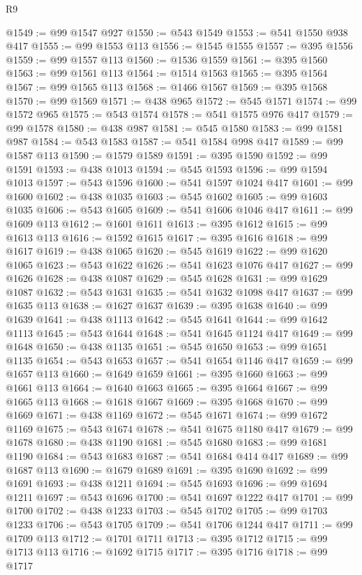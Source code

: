 \begin{lexlean}{R9}
\begin{coremodule}
{{{{{{{{{{{{{{{{{{{{{{{{{{{{{{{{{{{{{{{{{{{{{{{{{{{{{{{{{{{{{{{{{{{{{{{{{{{{{{{{{{{{@1549 := @99 @1547 @927
@1550 := @543 @1549
@1553 := @541 @1550 @938 @417
@1555 := @99 @1553 @113
@1556 := @1545 @1555
@1557 := @395 @1556
@1559 := @99 @1557 @113
@1560 := @1536 @1559
@1561 := @395 @1560
@1563 := @99 @1561 @113
@1564 := @1514 @1563
@1565 := @395 @1564
@1567 := @99 @1565 @113
@1568 := @1466 @1567
@1569 := @395 @1568
@1570 := @99 @1569
@1571 := @438 @965
@1572 := @545 @1571
@1574 := @99 @1572 @965
@1575 := @543 @1574
@1578 := @541 @1575 @976 @417
@1579 := @99 @1578
@1580 := @438 @987
@1581 := @545 @1580
@1583 := @99 @1581 @987
@1584 := @543 @1583
@1587 := @541 @1584 @998 @417
@1589 := @99 @1587 @113
@1590 := @1579 @1589
@1591 := @395 @1590
@1592 := @99 @1591
@1593 := @438 @1013
@1594 := @545 @1593
@1596 := @99 @1594 @1013
@1597 := @543 @1596
@1600 := @541 @1597 @1024 @417
@1601 := @99 @1600
@1602 := @438 @1035
@1603 := @545 @1602
@1605 := @99 @1603 @1035
@1606 := @543 @1605
@1609 := @541 @1606 @1046 @417
@1611 := @99 @1609 @113
@1612 := @1601 @1611
@1613 := @395 @1612
@1615 := @99 @1613 @113
@1616 := @1592 @1615
@1617 := @395 @1616
@1618 := @99 @1617
@1619 := @438 @1065
@1620 := @545 @1619
@1622 := @99 @1620 @1065
@1623 := @543 @1622
@1626 := @541 @1623 @1076 @417
@1627 := @99 @1626
@1628 := @438 @1087
@1629 := @545 @1628
@1631 := @99 @1629 @1087
@1632 := @543 @1631
@1635 := @541 @1632 @1098 @417
@1637 := @99 @1635 @113
@1638 := @1627 @1637
@1639 := @395 @1638
@1640 := @99 @1639
@1641 := @438 @1113
@1642 := @545 @1641
@1644 := @99 @1642 @1113
@1645 := @543 @1644
@1648 := @541 @1645 @1124 @417
@1649 := @99 @1648
@1650 := @438 @1135
@1651 := @545 @1650
@1653 := @99 @1651 @1135
@1654 := @543 @1653
@1657 := @541 @1654 @1146 @417
@1659 := @99 @1657 @113
@1660 := @1649 @1659
@1661 := @395 @1660
@1663 := @99 @1661 @113
@1664 := @1640 @1663
@1665 := @395 @1664
@1667 := @99 @1665 @113
@1668 := @1618 @1667
@1669 := @395 @1668
@1670 := @99 @1669
@1671 := @438 @1169
@1672 := @545 @1671
@1674 := @99 @1672 @1169
@1675 := @543 @1674
@1678 := @541 @1675 @1180 @417
@1679 := @99 @1678
@1680 := @438 @1190
@1681 := @545 @1680
@1683 := @99 @1681 @1190
@1684 := @543 @1683
@1687 := @541 @1684 @414 @417
@1689 := @99 @1687 @113
@1690 := @1679 @1689
@1691 := @395 @1690
@1692 := @99 @1691
@1693 := @438 @1211
@1694 := @545 @1693
@1696 := @99 @1694 @1211
@1697 := @543 @1696
@1700 := @541 @1697 @1222 @417
@1701 := @99 @1700
@1702 := @438 @1233
@1703 := @545 @1702
@1705 := @99 @1703 @1233
@1706 := @543 @1705
@1709 := @541 @1706 @1244 @417
@1711 := @99 @1709 @113
@1712 := @1701 @1711
@1713 := @395 @1712
@1715 := @99 @1713 @113
@1716 := @1692 @1715
@1717 := @395 @1716
@1718 := @99 @1717
}}}}}}}}}}}}}}}}}}}}}}}}}}}}}}}}}}}}}}}}}}}}}}}}}}}}}}}}}}}}}}}}}}}}}}}}}}}}}}}}}}}}
\end{coremodule}
\end{lexlean}
